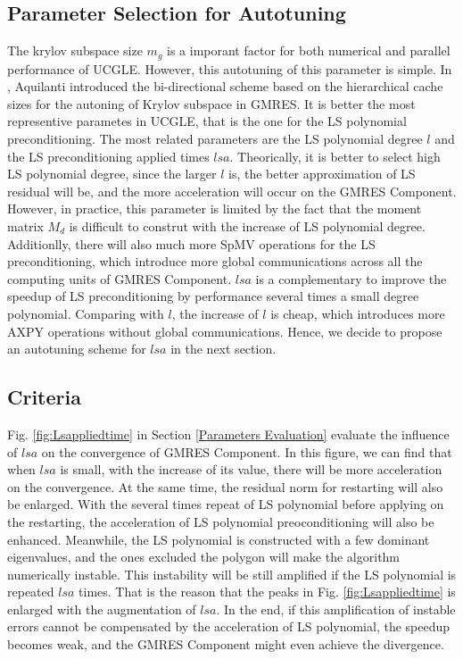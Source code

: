 \subsection{Parameter Selection for Autotuning}

The krylov subspace size $m_g$ is a imporant factor for both numerical and parallel performance of UCGLE. However, this autotuning of this parameter is simple. In \cite{pierreyvesthese2011}, Aquilanti introduced the bi-directional scheme based on the hierarchical cache sizes for the autoning of Krylov subspace in GMRES. It is better the most representive parametes in UCGLE, that is the one for the LS polynomial preconditioning.
The most related parameters are the LS polynomial degree $l$ and the LS preconditioning applied times $lsa$. Theorically, it is better to select high LS polynomial degree, since the larger $l$ is, the better approximation of LS residual will be, and the more acceleration will occur on the GMRES Component. However, in practice, this parameter is limited by the fact that the moment matrix $M_d$ is difficult to construt with the increase of LS polynomial degree. Additionlly, there will also much more SpMV operations for the LS preconditioning, which introduce more global communications across all the computing units of GMRES Component. $lsa$ is a complementary to improve the speedup of LS preconditioning by performance several times a small degree polynomial. Comparing with $l$, the increase of $l$ is cheap, which introduces more AXPY operations without global communications. Hence, we decide to propose an autotuning scheme for $lsa$ in the next section.

\subsection{Criteria}

Fig. \ref{fig:Lsappliedtime} in Section \ref{Parameters Evaluation} evaluate the influence of $lsa$ on the convergence of GMRES Component. In this figure, we can find that when $lsa$ is small, with the increase of its value, there will be more acceleration on the convergence. At the same time, the residual norm for restarting will also be enlarged. With the several times repeat of LS polynomial before applying on the restarting, the acceleration of LS polynomial preoconditioning will also be enhanced. Meanwhile, the LS polynomial is constructed with a few dominant eigenvalues, and the ones excluded the polygon will make the algorithm numerically instable. This instability will be still amplified if the LS polynomial is repeated $lsa$ times. That is the reason that the peaks in Fig. \ref{fig:Lsappliedtime} is enlarged with the augmentation of $lsa$. In the end, if this amplification of instable errors cannot be compensated by the acceleration of LS polynomial, the speedup becomes weak, and the GMRES Component might even achieve the divergence.


